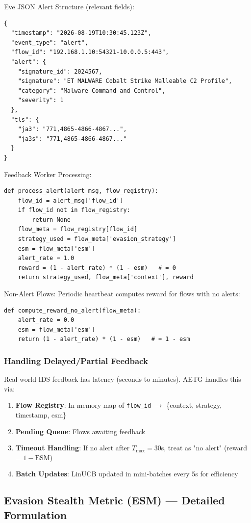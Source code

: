 \documentclass[review]{elsarticle}
\begin{document}
Eve JSON Alert Structure (relevant fields):
\begin{lstlisting}
{
  "timestamp": "2026-08-19T10:30:45.123Z",
  "event_type": "alert",
  "flow_id": "192.168.1.10:54321-10.0.0.5:443",
  "alert": {
    "signature_id": 2024567,
    "signature": "ET MALWARE Cobalt Strike Malleable C2 Profile",
    "category": "Malware Command and Control",
    "severity": 1
  },
  "tls": {
    "ja3": "771,4865-4866-4867...",
    "ja3s": "771,4865-4866-4867..."
  }
}
\end{lstlisting}

Feedback Worker Processing:
\begin{lstlisting}
def process_alert(alert_msg, flow_registry):
    flow_id = alert_msg['flow_id']
    if flow_id not in flow_registry:
        return None
    flow_meta = flow_registry[flow_id]
    strategy_used = flow_meta['evasion_strategy']
    esm = flow_meta['esm']
    alert_rate = 1.0
    reward = (1 - alert_rate) * (1 - esm)   # = 0
    return strategy_used, flow_meta['context'], reward
\end{lstlisting}

Non-Alert Flows: Periodic heartbeat computes reward for flows with no alerts:
\begin{lstlisting}
def compute_reward_no_alert(flow_meta):
    alert_rate = 0.0
    esm = flow_meta['esm']
    return (1 - alert_rate) * (1 - esm)   # = 1 - esm
\end{lstlisting}

\subsubsection{Handling Delayed/Partial Feedback}
Real-world IDS feedback has latency (seconds to minutes). AETG handles this via:
\begin{enumerate}
\item \textbf{Flow Registry}: In-memory map of \texttt{flow\_id} $\to$ \{context, strategy, timestamp, esm\}
\item \textbf{Pending Queue}: Flows awaiting feedback
\item \textbf{Timeout Handling}: If no alert after $T_{\max} = 30$s, treat as "no alert" (reward = $1 - \text{ESM}$)
\item \textbf{Batch Updates}: LinUCB updated in mini-batches every 5s for efficiency
\end{enumerate}

\subsection{Evasion Stealth Metric (ESM) — Detailed Formulation}
\end{document}

